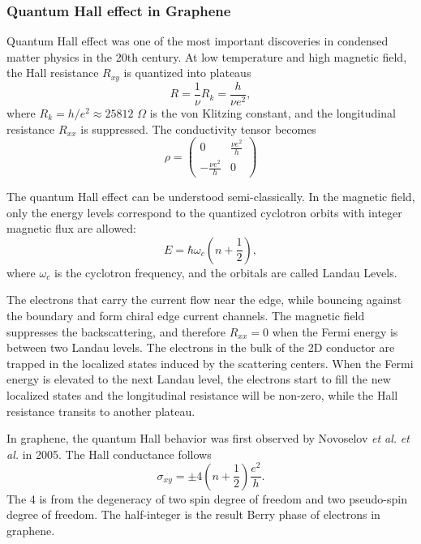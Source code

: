 \documentclass[pdflatex, sectionletters, 12pt, final, phd]{pittetd}    %
\begin{document}
\subsubsection{Quantum Hall effect in Graphene}
\label{SEC:QuantumHall}

Quantum Hall effect was one of the most important discoveries in condensed matter physics in the 20th century. At low temperature and high magnetic field, the Hall resistance $R_{xy}$ is quantized into plateaus\cite{klitzing1980new} 
$$
R = \frac{1}{\nu}R_k = \frac{h}{\nu e^2},
$$
where $R_k = h/e^2 \approx 25812$ $\Omega$ is the von Klitzing constant, and the longitudinal resistance $R_{xx}$ is suppressed. The conductivity tensor becomes
$$ \displaystyle
\rho = 
\begin{pmatrix}
0 & \frac{\nu e^2}{h} \\ 
-\frac{\nu e^2}{h} & 0
\end{pmatrix}
$$

The quantum Hall effect can be understood semi-classically. In the magnetic field, only the energy levels correspond to the quantized cyclotron orbits with integer magnetic flux are allowed:
$$E = \hbar\omega_c \left(n + \frac{1}{2}\right),$$
where $\omega_c$ is the cyclotron frequency, and the orbitals are called Landau Levels.

The electrons that carry the current flow near the edge, while bouncing against the boundary and form chiral edge current channels. The magnetic field suppresses the backscattering, and therefore $R_{xx} = 0$ when the Fermi energy is between two Landau levels. The electrons in the bulk of the 2D conductor are trapped in the localized states induced by the scattering centers. When the Fermi energy is elevated to the next Landau level, the electrons start to fill the new localized states and the longitudinal resistance will be non-zero, while the Hall resistance transits to another plateau.

In graphene, the quantum Hall behavior was first observed by Novoselov \textit{et al.} \cite{novoselov2005two} \textit{et al.}\cite{zhang2005experimental} in 2005. The Hall conductance follows
$$
\sigma_{xy} = \pm 4\left(n + \frac{1}{2}\right)\frac{e^2}{h}.
$$
The 4 is from the degeneracy of two spin degree of freedom and two pseudo-spin degree of freedom. The half-integer is the result Berry phase of electrons\cite{zhang2005experimental} in graphene.
\end{document}
